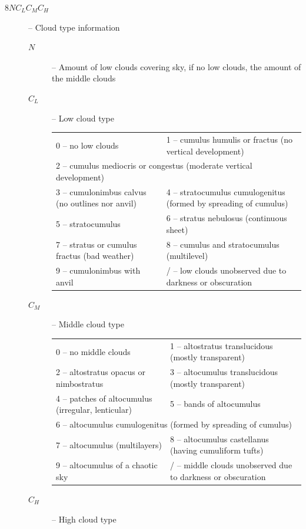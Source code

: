 \documentclass{article}
\begin{document}
\begin{description}
  \item[$8NC_LC_MC_H$] -- Cloud type information
    \begin{description}
      \item[$N$] -- Amount of low clouds covering sky, if no low clouds, the amount of the middle clouds
      \item[$C_L$] -- Low cloud type

        \begin{tabular}{ll}
          0 -- no low clouds& 1 -- cumulus humulis or fractus (no vertical development)\\
          \multicolumn{2}{l}{2 -- cumulus mediocris or congestus (moderate vertical development)}\\
          3 -- cumulonimbus calvus (no outlines nor anvil)&4 -- stratocumulus cumulogenitus (formed by spreading of cumulus)\\
          5 -- stratocumulus& 6 -- stratus nebulosus (continuous sheet)\\
          7 -- stratus or cumulus fractus (bad weather)&8 -- cumulus and stratocumulus (multilevel)\\
          9 -- cumulonimbus with anvil&/ -- low clouds unobserved due to darkness or obscuration
        \end{tabular}
      \item[$C_M$] -- Middle cloud type
        
        \begin{tabular}{ll} 
         0 -- no middle clouds&1 -- altostratus translucidous (mostly transparent)\\
          2 -- altostratus opacus or nimbostratus&3 -- altocumulus translucidous (mostly transparent)\\
          4 -- patches of altocumulus (irregular, lenticular)&5 -- bands of altocumulus\\
          \multicolumn{2}{l}{6 -- altocumulus cumulogenitus (formed by spreading of cumulus)}\\
          7 -- altocumulus (multilayers)&8 -- altocumulus castellanus (having cumuliform tufts)\\
          9 -- altocumulus of a chaotic sky&/ -- middle clouds unobserved due to darkness or obscuration \\
        \end{tabular}
      \item[$C_H$] -- High cloud type


\end{description}
\end{description}
\end{document}
